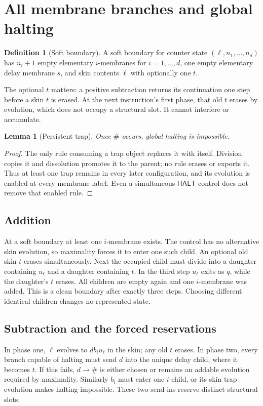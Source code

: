 \documentclass[11pt,letterpaper]{article}
\newtheorem{lemma}[theorem]{Lemma}
\theoremstyle{definition}
\newtheorem{definition}[theorem]{Definition}
\theoremstyle{remark}
\newcommand{\HALT}{\mathsf{HALT}}
\newcommand{\trap}{\#}
\begin{document}
\section{All membrane branches and global halting}\label{qoc:um:sec:memproof}
\begin{definition}[Soft boundary]
A soft boundary for counter state $(\ell,n_1,\ldots,n_d)$ has $n_i+1$ empty elementary $i$-membranes for $i=1,\ldots,d$, one empty elementary delay membrane $s$, and skin contents $\ell$ with optionally one $t$.
\end{definition}
The optional $t$ matters: a positive subtraction returns its continuation one step before a skin $t$ is erased. At the next instruction's first phase, that old $t$ erases by evolution, which does not occupy a structural slot. It cannot interfere or accumulate.

\begin{lemma}[Persistent trap]\label{qoc:um:lem:trap}
Once $\trap$ occurs, global halting is impossible.
\end{lemma}
\begin{proof}
The only rule consuming a trap object replaces it with itself. Division copies it and dissolution promotes it to the parent; no rule erases or exports it. Thus at least one trap remains in every later configuration, and its evolution is enabled at every membrane label. Even a simultaneous $\HALT$ control does not remove that enabled rule.
\end{proof}

\subsection{Addition}
At a soft boundary at least one $i$-membrane exists. The control has no alternative skin evolution, so maximality forces it to enter one such child. An optional old skin $t$ erases simultaneously. Next the occupied child must divide into a daughter containing $u_\ell$ and a daughter containing $t$. In the third step $u_\ell$ exits as $q$, while the daughter's $t$ erases. All children are empty again and one $i$-membrane was added. This is a clean boundary after exactly three steps. Choosing different identical children changes no represented state.

\subsection{Subtraction and the forced reservations}
In phase one, $\ell$ evolves to $d b_i u_\ell$ in the skin; any old $t$ erases. In phase two, every branch capable of halting must send $d$ into the unique delay child, where it becomes $t$. If this fails, $d\to\trap$ is either chosen or remains an addable evolution required by maximality. Similarly $b_i$ must enter one $i$-child, or its skin trap evolution makes halting impossible. These two send-ins reserve distinct structural slots.
\end{document}
